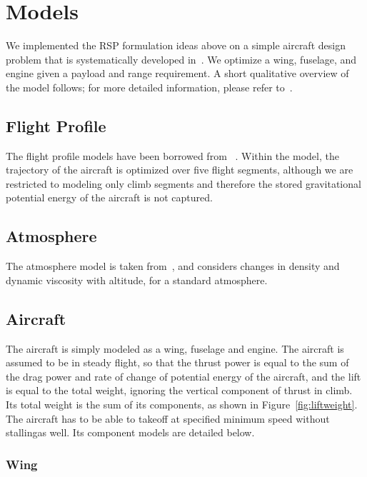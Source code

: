 \section{Models}

We implemented the RSP formulation ideas above on a simple aircraft design problem that is systematically developed in~\cite{Ozturk2018}.
We optimize a wing, fuselage, and engine given a payload and range requirement. A short qualitative overview of the model follows; for
more detailed information, please refer to~\cite{Ozturk2018}.

\subsection{Flight Profile}

The flight profile models have been borrowed from ~\cite{York2018}. Within the model, the
trajectory of the aircraft is optimized over five flight segments,
although we are restricted to modeling only climb segments
and therefore the stored gravitational potential energy of the aircraft is not captured.

\subsection{Atmosphere}

The atmosphere model is taken from~\cite{Tao2018}, and considers changes in density and dynamic
viscosity with altitude, for a standard atmosphere.

\subsection{Aircraft}

The aircraft is simply modeled as a wing, fuselage and engine. The aircraft is assumed
to be in steady flight, so that the thrust power is equal to the sum of the drag power and rate of change
of potential energy of the aircraft, and the lift is equal to the total weight, ignoring the vertical component of
thrust in climb. Its total weight is the sum of its components, as shown in Figure~\ref{fig:liftweight}.
The aircraft has to be able to takeoff at specified minimum speed without stallingas well.
Its component models are detailed below.

\subsubsection{Wing}

